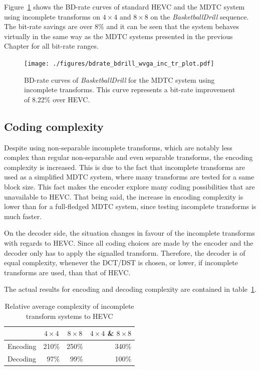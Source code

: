 \documentclass[11pt,a4paper,openright,twoside]{book}
\def\usepdfs{1} %
\numberwithin{equation}{section} %
\numberwithin{figure}{section} %
\numberwithin{table}{section} %
\begin{document}
Figure~\ref{fig:mdtc_bdrate_bdrill_inc_tr} shows the \ac{BD}-rate curves of
standard \ac{HEVC} and the \ac{MDTC} system using incomplete transforms on
$4\times4$ and $8\times8$ on the \emph{BasketballDrill} sequence.
The bit-rate savings are over 8\% and it can be seen that the system behaves
virtually in the same way as the \ac{MDTC} systems presented in the previous
Chapter for all bit-rate ranges.

\begin{figure}[tb]
	\centering
	\ifthenelse{\usepdfs = 0}
	{}
	{\texttt{[image: ./figures/bdrate\_bdrill\_wvga\_inc\_tr\_plot.pdf]}}
	\caption[\acs{BD}-rate curves for incomplete transforms on
	\emph{BasketballDrill}]
	{\acs{BD}-rate curves of \emph{BasketballDrill} for the \acs{MDTC} system
	using incomplete transforms.
	This curve represents a bit-rate improvement of 8.22\% over \acs{HEVC}.}
	\label{fig:mdtc_bdrate_bdrill_inc_tr}
\end{figure}

\subsection{Coding complexity}
\label{sub:it_coding_complexity}

Despite using non-separable incomplete transforms, which are notably less
complex than regular non-separable and even separable transforms, the encoding
complexity is increased.
This is due to the fact that incomplete transforms are used as a simplified
\ac{MDTC} system, where many transforms are tested for a same block size.
This fact makes the encoder explore many coding possibilities that are
unavailable to \ac{HEVC}.
That being said, the increase in encoding complexity is lower than for a
full-fledged \ac{MDTC} system, since testing incomplete transforms is much
faster.

On the decoder side, the situation changes in favour of the incomplete
transforms with regards to \ac{HEVC}.
Since all coding choices are made by the encoder and the decoder only has to
apply the signalled transform.
Therefore, the decoder is of equal complexity, whenever the \ac{DCT}/\ac{DST}
is chosen, or lower, if incomplete transforms are used, than that of
\ac{HEVC}.

The actual results for encoding and decoding complexity are contained in
table~\ref{tab:it_complexity}.

\begin{table}[tb]
	\centering
	\small
	\begin{tabular}{l|r|r|r}
		& \multicolumn{1}{c|}{$4\times4$}
		& \multicolumn{1}{c|}{$8\times8$}
		& \multicolumn{1}{c}{$4\times4$ \& $8\times8$} \\
		\hline\hline
		Encoding & 210\% & 250\% & 340\% \\
		Decoding &  97\% &  99\% & 100\% \\
	\end{tabular}
	\caption{Relative average complexity of incomplete transform systems to
	\acs{HEVC}}
	\label{tab:it_complexity}
\end{table}
\end{document}

